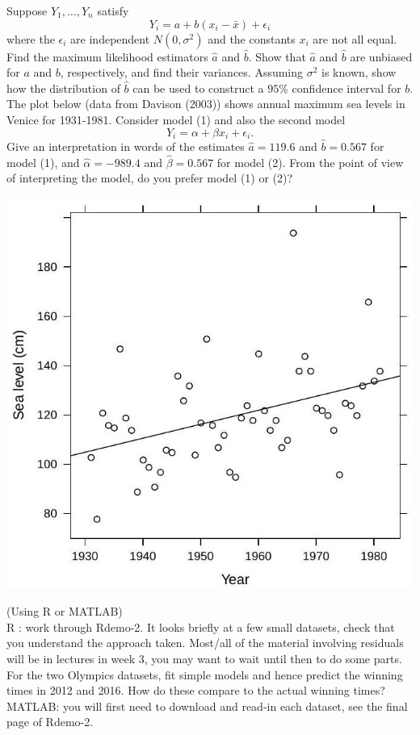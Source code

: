 \documentclass[answers]{exam}
\begin{document}
\begin{questions}
\question%
\begin{subparts}
\subpart Suppose $Y_{1}, \ldots, Y_{n}$ satisfy \begin{equation}
	Y_{i}=a+b\left(x_{i}-\bar{x}\right)+\epsilon_{i}
\end{equation} where the $\epsilon_{i}$ are independent $N\left(0, \sigma^{2}\right)$ and the constants $x_{i}$ are not all equal. Find the maximum likelihood estimators $\widehat{a}$ and $\widehat{b}$. Show that $\widehat{a}$ and $\widehat{b}$ are unbiased for $a$ and $b$, respectively, and find their variances. Assuming $\sigma^{2}$ is known, show how the distribution of $\widehat{b}$ can be used to construct a $95 \%$ confidence interval for $b$.
\subpart The plot below (data from Davison (2003)) shows annual maximum sea levels in Venice for 1931-1981. Consider model (1) and also the second model \begin{equation}
	Y_{i}=\alpha+\beta x_{i}+\epsilon_{i} .
\end{equation} Give an interpretation in words of the estimates $\widehat{a}=119.6$ and $\widehat{b}=0.567$ for model (1), and $\widehat{\alpha}=-989.4$ and $\widehat{\beta}=0.567$ for model (2). From the point of view of interpreting the model, do you prefer model (1) or (2)?
\end{subparts}
\begin{center}
\includegraphics[max width=.45\textwidth]{sheet 4}
\end{center}



\question%
(Using R or MATLAB)\\
$\mathrm{R}$ : work through Rdemo-2. It looks briefly at a few small datasets, check that you understand the approach taken. Most/all of the material involving residuals will be in lectures in week 3, you may want to wait until then to do some parts. For the two Olympics datasets, fit simple models and hence predict the winning times in 2012 and 2016. How do these compare to the actual winning times?\\
MATLAB: you will first need to download and read-in each dataset, see the final page of Rdemo-2.

\end{questions}
\end{document}
